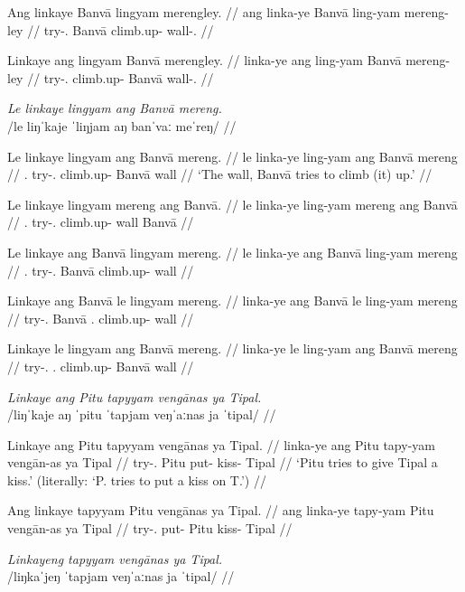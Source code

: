 \documentclass[12pt,a4paper]{scrartcl}
\newcommand{\PargI}{{\Parg}.{\Inan}}
\newcommand{\PatTI}{{\PatT}.{\Inan}}
\newcommand{\TsgF}{{\Tsg}.{\F}}
\begin{document}
\a\ljudge*\begingl
\gla Ang linkaye Banvā lingyam merengley. //
\glb ang linka-ye Banvā ling-yam mereng-ley //
\glc \AgtT{} try-\TsgF{} Banvā climb.up-\Ptcp{} wall-\PargI{} //
\endgl

\a\ljudge*\begingl
\gla Linkaye ang lingyam Banvā merengley. //
\glb linka-ye ang ling-yam Banvā mereng-ley //
\glc try-\TsgF{} \AgtT{} climb.up-\Ptcp{} Banvā wall-\PargI{} //
\endgl
\xe

\pex
\a\begingl
\glpreamble \textit{Le linkaye lingyam ang Banvā mereng.} \\
	/le liŋˈkaje ˈliŋjam aŋ banˈvaː meˈreŋ/ //

\gla Le linkaye lingyam ang Banvā mereng. //
\glb le linka-ye ling-yam ang Banvā mereng //
\glc \PatTI{} try-\TsgF{} climb.up-\Ptcp{} \Aarg{} Banvā wall //
\glft `The wall, Banvā tries to climb (it) up.' //
\endgl

\a\begingl
\gla Le linkaye lingyam mereng ang Banvā. //
\glb le linka-ye ling-yam mereng ang Banvā //
\glc \PatTI{} try-\TsgF{} climb.up-\Ptcp{} wall \Aarg{} Banvā //
\endgl

\a\label{ex:rightsideptcp}\ljudge*\begingl
\gla Le linkaye ang Banvā lingyam mereng. //
\glb le linka-ye ang Banvā ling-yam mereng //
\glc \PatTI{} try-\TsgF{} \Aarg{} Banvā climb.up-\Ptcp{} wall //
\endgl

\a\ljudge*\begingl
\gla Linkaye ang Banvā le lingyam mereng. //
\glb linka-ye ang Banvā le ling-yam mereng //
\glc try-\TsgF{} \Aarg{} Banvā \PatTI{} climb.up-\Ptcp{} wall //
\endgl

\a\ljudge*\begingl
\gla Linkaye le lingyam ang Banvā mereng. //
\glb linka-ye le ling-yam ang Banvā mereng //
\glc try-\TsgF{} \PatTI{} climb.up-\Ptcp{} \Aarg{} Banvā wall //
\endgl
\xe

\pex
\a\begingl
\glpreamble \textit{Linkaye ang Pitu tapyyam vengānas ya Tipal.} \\
	/liŋˈkaje aŋ ˈpitu ˈtapjam veŋˈaːnas ja ˈtipal/ //

\gla Linkaye ang Pitu tapyyam vengānas ya Tipal. //
\glb linka-ye ang Pitu tapy-yam vengān-as ya Tipal //
\glc try-\TsgF{} \AgtT{} Pitu put-\Ptcp{} kiss-\Parg{} \Loc{} Tipal //
\glft `Pitu tries to give Tipal a kiss.' (literally: `P. tries to put a kiss on T.') //
\endgl

\a\begingl
\gla Ang linkaye tapyyam Pitu vengānas ya Tipal. //
\glb ang linka-ye tapy-yam Pitu vengān-as ya Tipal //
\glc \AgtT{} try-\TsgF{} put-\Ptcp{} Pitu kiss-\Parg{} \Loc{} Tipal //
\endgl
\xe

\pex
\a\begingl
\glpreamble \textit{Linkayeng tapyyam vengānas ya Tipal.} \\
	/liŋkaˈjeŋ ˈtapjam veŋˈaːnas ja ˈtipal/ //
\end{document}
